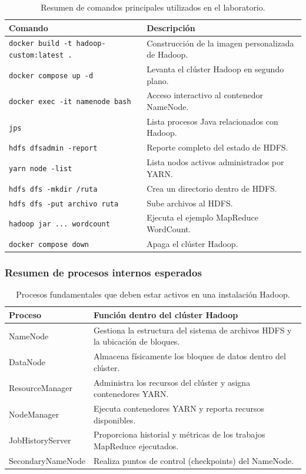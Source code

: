 \begin{table}[H]
\centering
\begin{tabular}{|p{8.2cm}|p{7cm}|}
\hline
\textbf{Comando} & \textbf{Descripción} \\
\hline
\verb|docker build -t hadoop-custom:latest .| & Construcción de la imagen personalizada de Hadoop. \\
\hline
\verb|docker compose up -d| & Levanta el clúster Hadoop en segundo plano. \\
\hline
\verb|docker exec -it namenode bash| & Acceso interactivo al contenedor NameNode. \\
\hline
\verb|jps| & Lista procesos Java relacionados con Hadoop. \\
\hline
\verb|hdfs dfsadmin -report| & Reporte completo del estado de HDFS. \\
\hline
\verb|yarn node -list| & Lista nodos activos administrados por YARN. \\
\hline
\verb|hdfs dfs -mkdir /ruta| & Crea un directorio dentro de HDFS. \\
\hline
\verb|hdfs dfs -put archivo ruta| & Sube archivos al HDFS. \\
\hline
\verb|hadoop jar ... wordcount| & Ejecuta el ejemplo MapReduce WordCount. \\
\hline
\verb|docker compose down| & Apaga el clúster Hadoop. \\
\hline
\end{tabular}
\caption{Resumen de comandos principales utilizados en el laboratorio.}
\end{table}

\subsubsection*{Resumen de procesos internos esperados}

\begin{table}[H]
\centering
\begin{tabular}{|p{4cm}|p{8cm}|}
\hline
\textbf{Proceso} & \textbf{Función dentro del clúster Hadoop} \\
\hline
NameNode & Gestiona la estructura del sistema de archivos HDFS y la ubicación de bloques. \\
\hline
DataNode & Almacena físicamente los bloques de datos dentro del clúster. \\
\hline
ResourceManager & Administra los recursos del clúster y asigna contenedores YARN. \\
\hline
NodeManager & Ejecuta contenedores YARN y reporta recursos disponibles. \\
\hline
JobHistoryServer & Proporciona historial y métricas de los trabajos MapReduce ejecutados. \\
\hline
SecondaryNameNode & Realiza puntos de control (checkpoints) del NameNode. \\
\hline
\end{tabular}
\caption{Procesos fundamentales que deben estar activos en una instalación Hadoop.}
\end{table}

